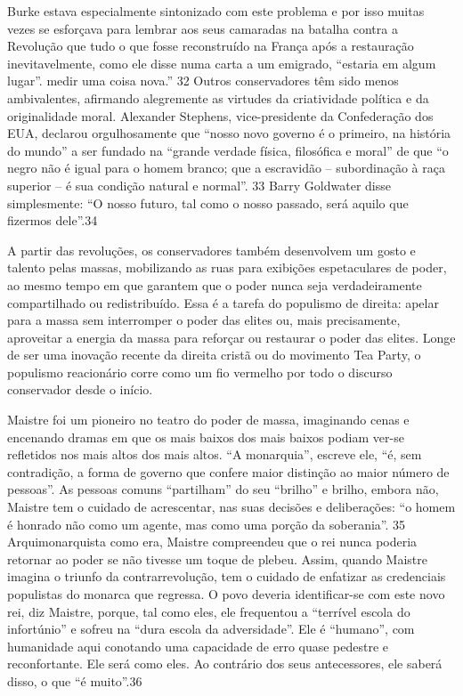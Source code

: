  \par 
Burke estava especialmente sintonizado com este problema e por isso muitas vezes se esforçava para lembrar aos seus camaradas na batalha contra a Revolução que tudo o que fosse reconstruído na França após a restauração inevitavelmente, como ele disse numa carta a um emigrado, “estaria em algum lugar”. medir uma coisa nova.” {\color{blue}32} Outros conservadores têm sido menos ambivalentes, afirmando alegremente as virtudes da criatividade política e da originalidade moral. Alexander Stephens, vice-presidente da Confederação dos EUA, declarou orgulhosamente que “nosso novo governo é o primeiro, na história do mundo” a ser fundado na “grande verdade física, filosófica e moral” de que “o negro não é igual para o homem branco; que a escravidão – subordinação à raça superior – é sua condição natural e normal”. {\color{blue}33} Barry Goldwater disse simplesmente: “O nosso futuro, tal como o nosso passado, será aquilo que fizermos dele”.{\color{blue}34}
 \par 
A partir das revoluções, os conservadores também desenvolvem um gosto e talento pelas massas, mobilizando as ruas para exibições espetaculares de poder, ao mesmo tempo em que garantem que o poder nunca seja verdadeiramente compartilhado ou redistribuído. Essa é a tarefa do populismo de direita: apelar para a massa sem interromper o poder das elites ou, mais precisamente, aproveitar a energia da massa para reforçar ou restaurar o poder das elites. Longe de ser uma inovação recente da direita cristã ou do movimento Tea Party, o populismo reacionário corre como um fio vermelho por todo o discurso conservador desde o início.
 \par 
Maistre foi um pioneiro no teatro do poder de massa, imaginando cenas e encenando dramas em que os mais baixos dos mais baixos podiam ver-se refletidos nos mais altos dos mais altos. “A monarquia”, escreve ele, “é, sem contradição, a forma de governo que confere maior distinção ao maior número de pessoas”. As pessoas comuns “partilham” do seu “brilho” e brilho, embora não, Maistre tem o cuidado de acrescentar, nas suas decisões e deliberações: “o homem é honrado não como um agente, mas como uma porção da soberania”. {\color{blue}35} Arquimonarquista como era, Maistre compreendeu que o rei nunca poderia retornar ao poder se não tivesse um toque de plebeu. Assim, quando Maistre imagina o triunfo da contrarrevolução, tem o cuidado de enfatizar as credenciais populistas do monarca que regressa. O povo deveria identificar-se com este novo rei, diz Maistre, porque, tal como eles, ele frequentou a “terrível escola do infortúnio” e sofreu na “dura escola da adversidade”. Ele é “humano”, com humanidade aqui conotando uma capacidade de erro quase pedestre e reconfortante. Ele será como eles. Ao contrário dos seus antecessores, ele saberá disso, o que “é muito”.{\color{blue}36}
